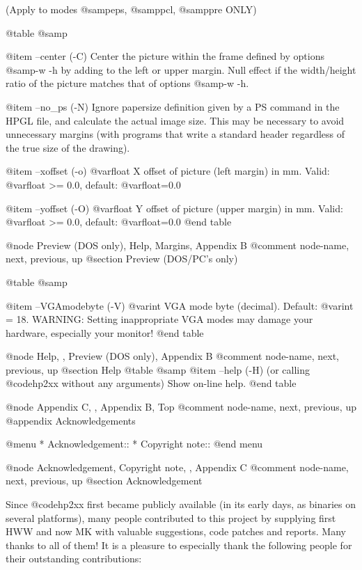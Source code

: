 (Apply to modes @samp{eps}, @samp{pcl}, @samp{pre} ONLY)

@table @samp

@item --center (-C)
Center the picture within the frame defined by options @samp{-w -h} by
adding to the left or upper margin. Null effect if the width/height
ratio of the picture matches that of options @samp{-w -h}.

@item --no_ps (-N)
Ignore papersize definition given by a PS command in the HPGL file, and
calculate the actual image size. This may be necessary to avoid unnecessary
margins (with programs that write a standard header regardless of the true
size of the drawing).

@item --xoffset (-o) @var{float}
X offset of picture (left  margin) in mm.
Valid: @var{float} >= 0.0, default: @var{float}=0.0

@item --yoffset (-O) @var{float}
Y offset of picture (upper  margin) in mm.
Valid: @var{float} >= 0.0, default: @var{float}=0.0
@end table



@node Preview (DOS only), Help, Margins, Appendix B
@comment  node-name,  next,  previous,  up
@section  Preview (DOS/PC's only)

@table @samp

@item --VGAmodebyte (-V) @var{int}
VGA mode byte (decimal). Default: @var{int} = 18.
WARNING: Setting inappropriate VGA modes may damage your hardware,
especially your monitor!
@end table


@node Help, , Preview (DOS only), Appendix B
@comment  node-name,  next,  previous,  up
@section  Help
@table @samp
@item --help (-H)
(or calling @code{hp2xx} without any arguments)  Show on-line help.
@end table



@node Appendix C, , Appendix B, Top
@comment  node-name,  next,  previous,  up
@appendix Acknowledgements

@menu
* Acknowledgement::
* Copyright note::
@end menu


@node Acknowledgement, Copyright note, , Appendix C
@comment  node-name,  next,  previous,  up
@section Acknowledgement

Since @code{hp2xx} first became publicly available (in its early days, as 
binaries on several platforms), many people contributed to this project by 
supplying first HWW and now MK with valuable suggestions, code patches and 
reports. Many thanks to all of them!
It is a pleasure to especially thank the following people for their
outstanding contributions:

